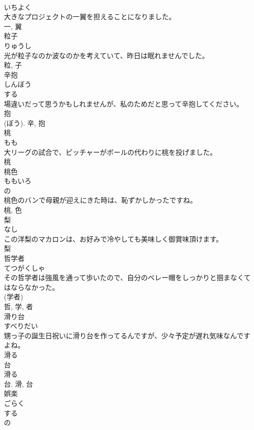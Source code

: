 \documentclass[8pt]{extreport}
\begin{document}
\begin{CJK}{UTF8}{min}
\\	いちよく	
\\	大きなプロジェクトの一翼を担えることになりました。	
\\	一, 翼	
\\	粒子	
\\	りゅうし	
\\	光が粒子なのか波なのかを考えていて、昨日は眠れませんでした。	
\\	粒, 子	
\\	辛抱	
\\	しんぼう	
\\	する 
\\	場違いだって思うかもしれませんが、私のためだと思って辛抱してください。	
\\	抱
\\	(ぼう).	辛, 抱	
\\	桃	
\\	もも	
\\	大リーグの試合で、ピッチャーがボールの代わりに桃を投げました。	
\\	桃	
\\	桃色	
\\	ももいろ	
\\	の 
\\	桃色のバンで母親が迎えにきた時は、恥ずかしかったですね。	
\\	桃, 色	
\\	梨	
\\	なし	
\\	この洋梨のマカロンは、お好みで冷やしても美味しく御賞味頂けます。	
\\	梨	
\\	哲学者	
\\	てつがくしゃ	
\\	その哲学者は強風を通って歩いたので、自分のベレー帽をしっかりと掴まなくてはならなかった。	
\\	(学者) 
\\	哲, 学, 者	
\\	滑り台	
\\	すべりだい	
\\	甥っ子の誕生日祝いに滑り台を作ってるんですが、少々予定が遅れ気味なんですよね。	
\\	滑る 
\\	台 
\\	滑る 
\\	台.	滑, 台	
\\	娯楽	
\\	ごらく	
\\	する 
\\	の 

\end{CJK}
\end{document}
